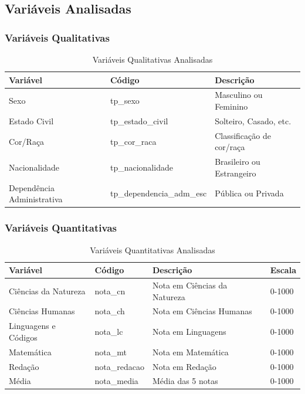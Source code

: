 \documentclass[12pt,a4paper]{article}
\begin{document}
\subsection{Variáveis Analisadas}

\subsubsection{Variáveis Qualitativas}

\begin{table}[H]
\centering
\begin{tabular}{|l|l|l|}
\hline
\textbf{Variável} & \textbf{Código} & \textbf{Descrição} \\
\hline
Sexo & tp\_sexo & Masculino ou Feminino \\
\hline
Estado Civil & tp\_estado\_civil & Solteiro, Casado, etc. \\
\hline
Cor/Raça & tp\_cor\_raca & Classificação de cor/raça \\
\hline
Nacionalidade & tp\_nacionalidade & Brasileiro ou Estrangeiro \\
\hline
Dependência Administrativa & tp\_dependencia\_adm\_esc & Pública ou Privada \\
\hline
\end{tabular}
\caption{Variáveis Qualitativas Analisadas}
\end{table}

\subsubsection{Variáveis Quantitativas}

\begin{table}[H]
\centering
\begin{tabular}{|l|l|l|l|}
\hline
\textbf{Variável} & \textbf{Código} & \textbf{Descrição} & \textbf{Escala} \\
\hline
Ciências da Natureza & nota\_cn & Nota em Ciências da Natureza & 0-1000 \\
\hline
Ciências Humanas & nota\_ch & Nota em Ciências Humanas & 0-1000 \\
\hline
Linguagens e Códigos & nota\_lc & Nota em Linguagens & 0-1000 \\
\hline
Matemática & nota\_mt & Nota em Matemática & 0-1000 \\
\hline
Redação & nota\_redacao & Nota em Redação & 0-1000 \\
\hline
Média & nota\_media & Média das 5 notas & 0-1000 \\
\hline
\end{tabular}
\caption{Variáveis Quantitativas Analisadas}
\end{table}
\end{document}

